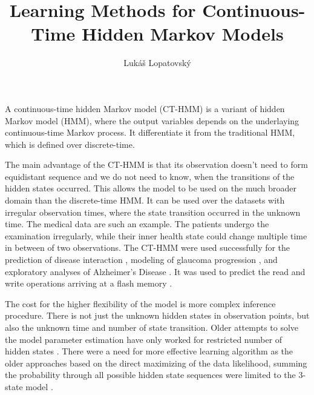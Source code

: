 \documentclass[thesis=M,english]{FITthesis}[2012/10/20]
\title{Learning Methods for Continuous-Time Hidden Markov Models}
\author{Luk{\' a}{\v s} Lopatovsk{\' y}} %
\begin{document}


\begin{introduction}

A continuous-time hidden Markov model (CT-HMM) is a variant of hidden Markov model (HMM), where the output variables depends on the underlaying continuous-time Markov process. It differentiate it from the traditional HMM, which is defined over discrete-time. 

The main advantage of the CT-HMM is that its observation doesn't need to form equidistant sequence and we do not need to know, when the transitions of the hidden states occurred. This allows the model to be used on the much broader domain than the discrete-time HMM. It can be used over the datasets with irregular observation times, where the state transition occurred in the unknown time. The medical data are such an example. The patients undergo the examination irregularly, while their inner health state could change multiple time in between of two observations. The CT-HMM were used successfully for the prediction of disease interaction \cite{Le11}, modeling of glaucoma progression \cite{Li13} \cite{Li15}, and exploratory analyses of Alzheimer's Disease \cite{Li15}. It was used to predict the read and write operations arriving at a flash memory \cite{Zr10}.      

The cost for the higher flexibility of the model is more complex inference procedure. There is not just the unknown hidden states in observation points, but also the unknown time and number of state transition. Older attempts to solve the model parameter estimation have only worked for restricted number of hidden states \cite{Zr10} \cite{Ja11}. There were a need for more effective learning algorithm as the older approaches based on the direct maximizing of the data likelihood, summing the probability through all possible hidden state sequences were limited to the 3-state model \cite{Li13}.    


\end{introduction}
\end{document}
